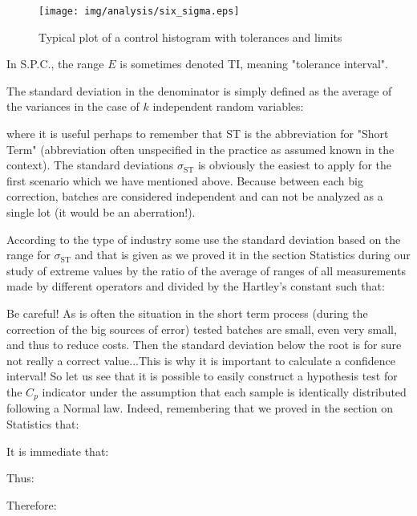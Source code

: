 \begin{enumerate}
		\begin{figure}[H]
		\centering
		\texttt{[image: img/analysis/six\_sigma.eps]}
		\caption{Typical plot of a control histogram with tolerances and limits}
		\end{figure}
		
		\begin{tcolorbox}[title=Remark,colframe=black,arc=10pt]
In S.P.C., the range $E$ is sometimes denoted TI, meaning "tolerance interval".
		\end{tcolorbox}
		
		The standard deviation in the denominator is simply defined as the average of the variances in the case of $k$ independent random variables:
			
		where it is useful perhaps to remember that ST is the abbreviation for "Short Term" (abbreviation often unspecified in the practice as assumed known in the context). The standard deviations $\sigma_{\text{ST}}$ is obviously the easiest to apply for the first scenario which we have mentioned above. Because between each big correction, batches are considered independent and can not be analyzed as a single lot (it would be an aberration!).
		
		\begin{tcolorbox}[title=Remark,colframe=black,arc=10pt]
		According to the type of industry some use the standard deviation based on the range for $\sigma_{\text{ST}}$ and that is given as we proved it in the section Statistics during our study of extreme values by the ratio of the average of ranges of all measurements made by different operators and divided by the Hartley's constant such that:
		
		\end{tcolorbox}
		
		
		Be careful! As is often the situation in the short term process (during the correction of the big sources of error) tested batches are small, even very small, and thus to reduce costs. Then the standard deviation below the root is for sure not really a correct value...This is why it is important to calculate a confidence interval! So let us see that it is possible to easily construct a hypothesis test for the $C_p$ indicator under the assumption that each sample is identically distributed following a Normal law. Indeed, remembering that we proved in the section on Statistics that:
		
		It is immediate that:
		
		Thus:
		
		Therefore:	
		

\end{enumerate}
